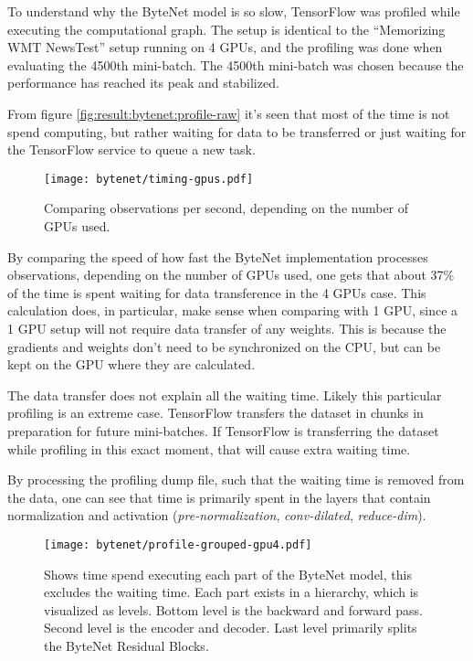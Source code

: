 To understand why the ByteNet model is so slow, TensorFlow was profiled while executing the computational graph. The setup is identical to the ``Memorizing WMT NewsTest'' setup running on 4 GPUs, and the profiling was done when evaluating the 4500th mini-batch. The 4500th mini-batch was chosen because the performance has reached its peak and stabilized.

From figure \ref{fig:result:bytenet:profile-raw} it's seen that most of the time is not spend computing, but rather waiting for data to be transferred or just waiting for the TensorFlow service to queue a new task.

\begin{figure}[h]
    \centering
    \texttt{[image: bytenet/timing-gpus.pdf]}
    \caption{Comparing observations per second, depending on the number of GPUs used.}
    \label{fig:result:bytenet:timing-gpus}
\end{figure}

By comparing the speed of how fast the ByteNet implementation processes observations, depending on the number of GPUs used, one gets that about 37\% of the time is spent waiting for data transference in the 4 GPUs case. This calculation does, in particular, make sense when comparing with 1 GPU, since a 1 GPU setup will not require data transfer of any weights. This is because the gradients and weights don't need to be synchronized on the CPU, but can be kept on the GPU where they are calculated.

The data transfer does not explain all the waiting time. Likely this particular profiling is an extreme case. TensorFlow transfers the dataset in chunks in preparation for future mini-batches. If TensorFlow is transferring the dataset while profiling in this exact moment, that will cause extra waiting time.

By processing the profiling dump file, such that the waiting time is removed from the data, one can see that time is primarily spent in the layers that contain normalization and activation (\textit{pre-normalization}, \textit{conv-dilated}, \textit{reduce-dim}).

\begin{figure}[h]
    \centering
    \texttt{[image: bytenet/profile-grouped-gpu4.pdf]}
    \caption{Shows time spend executing each part of the ByteNet model, this excludes the waiting time. Each part exists in a hierarchy, which is visualized as levels. Bottom level is the backward and forward pass. Second level is the encoder and decoder. Last level primarily splits the ByteNet Residual Blocks.}
    \label{fig:result:bytenet:profile-grouped}
\end{figure}

